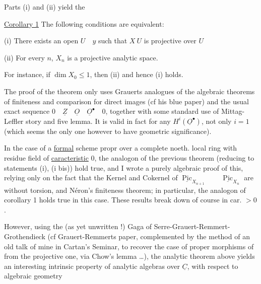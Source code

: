 
Parts (i) and (ii) yield the

\uline{Corollary 1} The following conditions are equivalent:

(i) There exists an open $U\quad y$ such that $X\ U$ is projective over $U$

(ii) For every $n$, $X_n$ is a projective analytic space.

For instance, if $\dim X_0\leq 1$, then (ii) and hence (i) holds.

The proof of the theorem only uses Grauerts analogues of the algebraic theorems of finiteness and comparison for direct images (cf his blue paper) and the usual exact sequence $0\quad\underline{Z}\quad\underline{O}\quad\underline{O}^{\bullet}\quad0$, together with some standard use of Mittag-Leffler story and five lemma. It is valid in fact for any $H^i(\underline{O}^{\bullet})$, not only $i=1$ (which seems the only one however to have geometric significance).

In the case of a \uline{formal} scheme propr over a complete noeth. local ring with residue field of \uline{caracteristic} 0, the analogon of the previous theorem (reducing to statements (i), (i bis))  hold true, and I wrote a purely algebraic proof of this, relying only on the fact that the Kernel and Cokernel of $\underline{\operatorname{Pic}}_{X_{n+1}}\qquad\underline{\operatorname{Pic}}_{X_n}$ are without torsion, and Néron's finiteness theorem; in particular, the analogon of corollary 1 holds true in this case. These results break down of course in car. $>0$.

However, using the (as yet unwritten !) Gaga of Serre-Grauert-Remmert-Grothendieck (cf Grauert-Remmerts paper, complemented by the method of an old talk of mine in Cartan's Seminar, to recover the case of proper morphisms of  from the projective one, via Chow's lemma \ldots), the analytic theorem above yields an interesting intrinsic property of analytic algebras over $\underline{C}$, with respect to algebraic geometry


